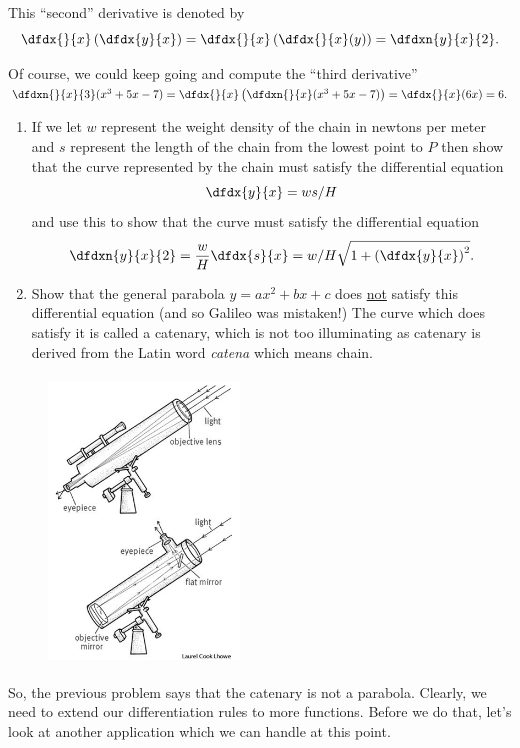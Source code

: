 This ``second'' derivative is denoted by 
$$
\dfdx{}{x}\left(\dfdx{y}{x}\right) =
\dfdx{}{x}\left(\dfdx{}{x}(y)\right) = \dfdxn{y}{x}{2}.
$$

Of course, we could keep going and compute the ``third derivative''
$\dfdxn{}{x}{3} (x^3+5x-7)
=\dfdx{}{x}\left(\dfdxn{}{x}(x^3+5x-7)\right)=\dfdx{}{x} (6x)=6. $ 

\begin{embeddedproblem}{}
    \begin{enumerate}[label={\bf{}(\alph*)}]
    \item If we let $w$ represent the weight density of the chain in
      newtons per meter and $s$ represent the length of the chain from
      the lowest point to $P$ then show that the curve represented by
      the chain must satisfy the differential equation
$$
\dfdx{y}{x}=ws/H
$$
and use this to show that the curve must satisfy the differential equation
$$
\dfdxn{y}{x}{2}=\frac{w}{H}  \dfdx{s}{x}=w/H
\sqrt{1+\left(\dfdx{y}{x}\right)^2 }.
$$
\item Show that the general parabola $y=ax^2+bx+c$ does \underline{not} satisfy this
  differential equation (and so Galileo was mistaken!)  The curve
  which does satisfy it is called a catenary, which is not too
  illuminating as catenary is derived from the Latin word {\it{}catena} which
  means chain.
    \end{enumerate}
\end{embeddedproblem}


\begin{figure}
\captionsetup{labelformat=empty}
\centerline{\includegraphics*[height=3in,width=2in]{Figures/RefractiveAndReflectiveTelescopes}}
\label{fig:}
\end{figure}
So, the previous problem says that the catenary is not a parabola.
Clearly, we need to extend our differentiation rules to more
functions.  Before we do that, let's look at another application which
we can handle at this point.  

